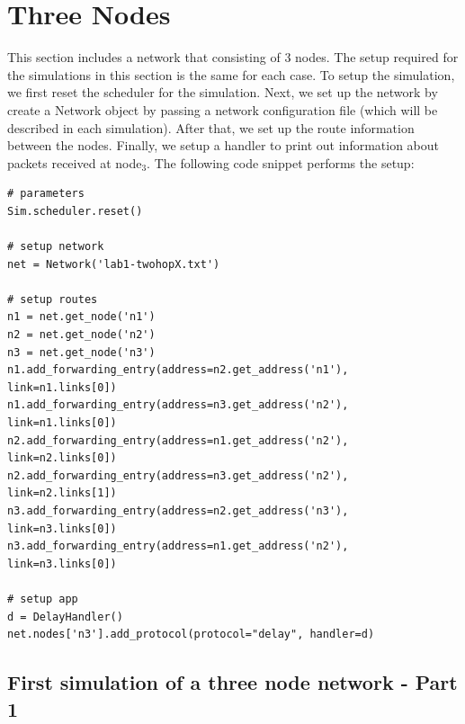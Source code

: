 \documentclass[fleqn,11pt]{article}
\begin{document}
\section{Three Nodes}
This section includes a network that consisting of 3 nodes. The setup required for the simulations in this section is the same for each case. To setup the simulation, we first reset the scheduler for the simulation. Next, we set up the network by create a Network object by passing a network configuration file (which will be described in each simulation). After that, we set up the route information between the nodes. Finally, we setup a handler to print out information about packets received at node$_3$. The following code snippet performs the setup:
\begin{lstlisting}
# parameters
Sim.scheduler.reset()

# setup network
net = Network('lab1-twohopX.txt')

# setup routes
n1 = net.get_node('n1')
n2 = net.get_node('n2')
n3 = net.get_node('n3')
n1.add_forwarding_entry(address=n2.get_address('n1'), link=n1.links[0])
n1.add_forwarding_entry(address=n3.get_address('n2'), link=n1.links[0])
n2.add_forwarding_entry(address=n1.get_address('n2'), link=n2.links[0])
n2.add_forwarding_entry(address=n3.get_address('n2'), link=n2.links[1])
n3.add_forwarding_entry(address=n2.get_address('n3'), link=n3.links[0])
n3.add_forwarding_entry(address=n1.get_address('n2'), link=n3.links[0])

# setup app
d = DelayHandler()
net.nodes['n3'].add_protocol(protocol="delay", handler=d)
\end{lstlisting}
\subsection{First simulation of a three node network - Part 1}
\end{document}
